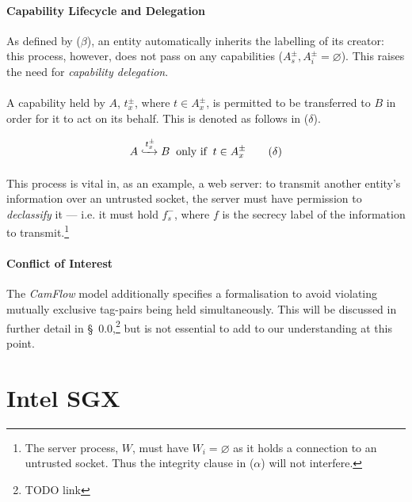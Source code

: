 \paragraph{Capability Lifecycle and Delegation} As defined by ($\beta$), an entity automatically inherits the labelling of its creator: this process, however, does not pass on any capabilities ($A_{s}^{\pm}, A_{i}^{\pm} = \varnothing$). This raises the need for \textit{capability delegation}.

\paragraph{} A capability held by $A$, $t_{x}^{\pm}$, where $t \in A_{x}^{\pm}$, is permitted to be transferred to $B$ in order for it to act on its behalf. This is denoted as follows in ($\delta$).


\begin{equation}
    A \xhookrightarrow[]{t^{\pm}_{x}} B \;\; \text{only if} \;\; t \in A_{x}^{\pm} \tag{$\delta$}
\end{equation}

\paragraph{} This process is vital in, as an example, a web server: to transmit another entity's information over an untrusted socket, the server must have permission to \textit{declassify} it --- i.e. it must hold $f_{s}^{-}$, where $f$ is the secrecy label of the information to transmit.\footnote{The server process, $W$, must have $W_{i} = \varnothing$ as it holds a connection to an untrusted socket. Thus the integrity clause in ($\alpha$) will not interfere.}

\paragraph{Conflict of Interest} The \textit{CamFlow} model additionally specifies a formalisation to avoid violating mutually exclusive tag-pairs being held simultaneously. This will be discussed in further detail in §~0.0,\footnote{TODO link} but is not essential to add to our understanding at this point.




\section{Intel SGX}

